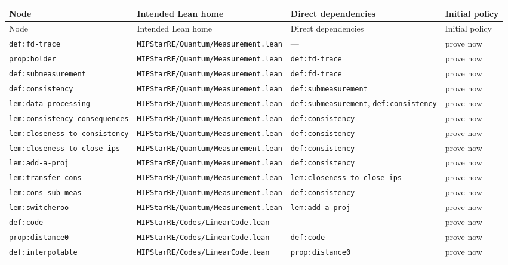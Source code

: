 \documentclass{article}
\theoremstyle{remark}
\begin{document}
\small
\begin{longtable}{L{0.16\textwidth}L{0.27\textwidth}L{0.33\textwidth}L{0.14\textwidth}}
\toprule
Node & Intended Lean home & Direct dependencies & Initial policy \\
\midrule
\endfirsthead
\toprule
Node & Intended Lean home & Direct dependencies & Initial policy \\
\midrule
\endhead
\texttt{def:fd-trace} & \texttt{MIPStarRE/Quantum/Measurement.lean} & --- & prove now \\
\texttt{prop:holder} & \texttt{MIPStarRE/Quantum/Measurement.lean} & \texttt{def:fd-trace} & prove now \\
\texttt{def:submeasurement} & \texttt{MIPStarRE/Quantum/Measurement.lean} & \texttt{def:fd-trace} & prove now \\
\texttt{def:consistency} & \texttt{MIPStarRE/Quantum/Measurement.lean} & \texttt{def:submeasurement} & prove now \\
\texttt{lem:data-processing} & \texttt{MIPStarRE/Quantum/Measurement.lean} & \texttt{def:submeasurement}, \texttt{def:consistency} & prove now \\
\texttt{lem:consistency-consequences} & \texttt{MIPStarRE/Quantum/Measurement.lean} & \texttt{def:consistency} & prove now \\
\texttt{lem:closeness-to-consistency} & \texttt{MIPStarRE/Quantum/Measurement.lean} & \texttt{def:consistency} & prove now \\
\texttt{lem:closeness-to-close-ips} & \texttt{MIPStarRE/Quantum/Measurement.lean} & \texttt{def:consistency} & prove now \\
\texttt{lem:add-a-proj} & \texttt{MIPStarRE/Quantum/Measurement.lean} & \texttt{def:consistency} & prove now \\
\texttt{lem:transfer-cons} & \texttt{MIPStarRE/Quantum/Measurement.lean} & \texttt{lem:closeness-to-close-ips} & prove now \\
\texttt{lem:cons-sub-meas} & \texttt{MIPStarRE/Quantum/Measurement.lean} & \texttt{def:consistency} & prove now \\
\texttt{lem:switcheroo} & \texttt{MIPStarRE/Quantum/Measurement.lean} & \texttt{lem:add-a-proj} & prove now \\
\texttt{def:code} & \texttt{MIPStarRE/Codes/LinearCode.lean} & --- & prove now \\
\texttt{prop:distance0} & \texttt{MIPStarRE/Codes/LinearCode.lean} & \texttt{def:code} & prove now \\
\texttt{def:interpolable} & \texttt{MIPStarRE/Codes/LinearCode.lean} & \texttt{prop:distance0} & prove now \\

\end{longtable}
\end{document}

